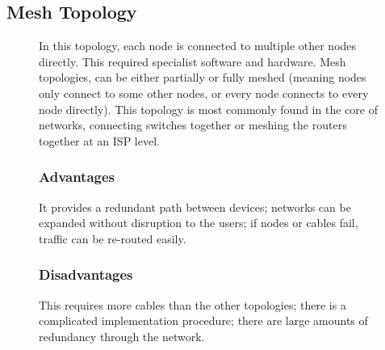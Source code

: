 \subsection*{Mesh Topology}
\begin{figure}[H]
    \begin{minipage}[H]{0.6\textwidth}
        In this topology, each node is connected to multiple other nodes directly. This required specialist software and hardware. Mesh topologies, can be either partially or fully meshed (meaning nodes only connect to some other nodes, or every node connects to every node directly). This topology is most commonly found in the core of networks, connecting switches together or meshing the routers together at an ISP level.
        \subsubsection*{Advantages}
        It provides a redundant path between devices; networks can be expanded without disruption to the users; if nodes or cables fail, traffic can be re-routed easily.
        \subsubsection*{Disadvantages}
        This requires more cables than the other topologies; there is a complicated implementation procedure; there are large amounts of redundancy through the network.
    \end{minipage}\hfill
    \begin{minipage}[H]{0.35\textwidth}
        \centering
    \end{minipage}\hfill
\end{figure}
